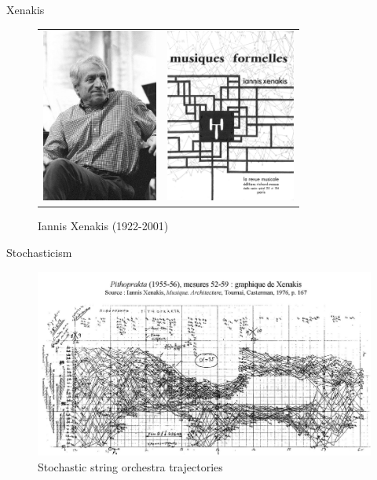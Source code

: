 \begin{frame}{Xenakis}
    \begin{figure}
    \begin{centering}
    \begin{tabular}{cc}
    \includegraphics[height=2.25in]{assets/include-xenakis-portrait.jpg}
    &
    \includegraphics[height=2.25in]{assets/include-xenakis-formalized-music.jpg}
    \end{tabular}
    \caption{Iannis Xenakis (1922-2001)}
    \end{centering}
    \end{figure}
\end{frame}

\begin{frame}{Stochasticism}
    \begin{figure}
    \begin{centering}
    \includegraphics[max width=\linewidth]{assets/include-xenakis-pithoprakta.jpg}
    \caption{Stochastic string orchestra trajectories}
    \end{centering}
    \end{figure}
\end{frame}

